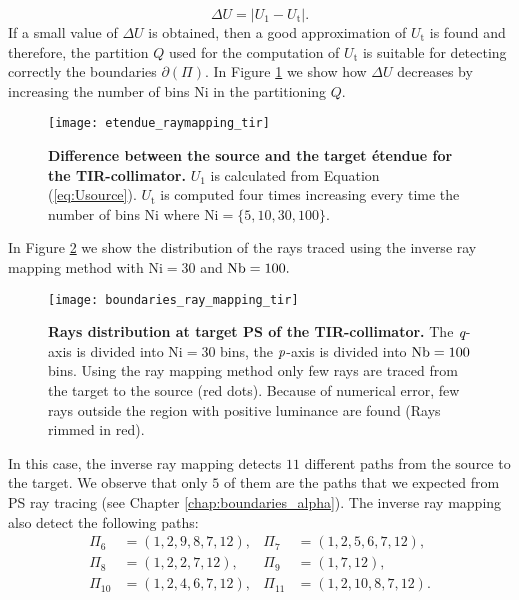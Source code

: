 \begin{equation}\label{eq:delta_raymapping}
\Delta U =  \big|U_1-U_{\textrm{t}}\big|.
\end{equation}
If a small value of $\Delta U$ is obtained, then a good approximation of $U_{\textrm{t}}$ is found and therefore, the partition $Q$ used for the computation of $U_{\textrm{t}}$ is suitable for detecting correctly the boundaries $\partial$$(\Pi)$. In Figure \ref{fig:etendue_raymapping_tir} we show how $\Delta U$ decreases by increasing the number of bins $\textrm{Ni}$ in the partitioning $Q$.  
\begin{figure}[h]
  \begin{center}
  \texttt{[image: etendue\_raymapping\_tir]}
  \end{center}
  \caption{\textbf{Difference between the source and the target \'{e}tendue for the TIR-collimator.}
 $U_1$ is calculated from Equation (\ref{eq:Usource}). $U_{\textrm{t}}$ is computed four times increasing every time the number of bins $\textrm{Ni}$ where $\textrm{Ni}=\{5,10,30,100\}$. }
\label{fig:etendue_raymapping_tir}
 \end{figure}
In Figure \ref{fig:boundaries_TIR_ray_mapping} we show the distribution of the rays traced using the inverse ray mapping method with $\textrm{Ni}=30$ and $\textrm{Nb} = 100.$ 
\begin{figure}[h]
  \begin{center}
  \texttt{[image: boundaries\_ray\_mapping\_tir]}
  \end{center}
  \caption{\textbf{Rays distribution at target PS of the TIR-collimator.}
 The $\textit{q}$-axis is divided into $\textrm{Ni}=30$ bins, the $\textit{p}$-axis is divided into $\textrm{Nb} = 100$ bins. Using the ray mapping method only few rays are traced from the target to the source (red dots). Because of numerical error, few rays outside the region with positive luminance are found (Rays rimmed in red).}
\label{fig:boundaries_TIR_ray_mapping}
 \end{figure}
In this case, the inverse ray mapping detects $11$ different paths from the source to the target. 
We observe that only $5$ of them are the paths that we expected from PS ray tracing (see Chapter \ref{chap:boundaries_alpha}). 
The inverse ray mapping also detect the following paths:
\begin{equation}\label{eq:paths_tir}
\begin{array}{llll}
\Pi_6&=(1,2,9,8,7,12), & \Pi_7&=(1,2,5,6,7,12), \\
\Pi_8&=(1,2,2,7,12),& \Pi_9&=(1,7,12),\\
\Pi_{10}&=(1,2,4,6,7,12),& \Pi_{11}&=(1,2,10,8,7,12).
\end{array}\end{equation}
